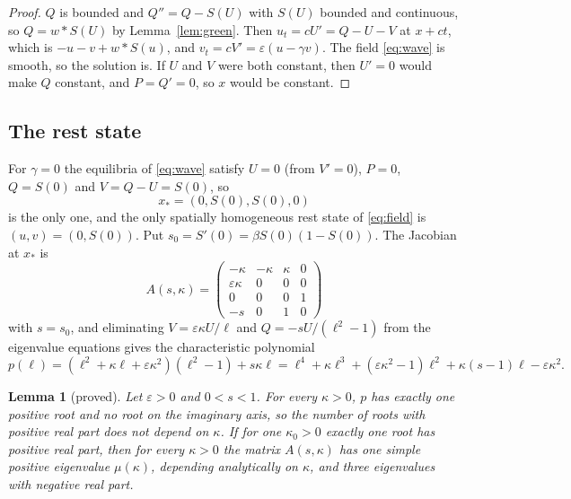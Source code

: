\documentclass[11pt]{article}
\newtheorem{lemma}{Lemma}[section]
\theoremstyle{definition}
\newcommand{\eps}{\varepsilon}
\newcommand{\xs}{x_*}
\begin{document}
\begin{proof}
$Q$ is bounded and $Q'' = Q - S(U)$ with $S(U)$ bounded and continuous, so $Q = w * S(U)$ by Lemma~\ref{lem:green}. Then $u_t = cU' = Q - U - V$ at $x + ct$, which is $-u - v + w * S(u)$, and $v_t = cV' = \eps(u - \gamma v)$. The field \eqref{eq:wave} is smooth, so the solution is. If $U$ and $V$ were both constant, then $U' = 0$ would make $Q$ constant, and $P = Q' = 0$, so $x$ would be constant.
\end{proof}

\subsection{The rest state}

For $\gamma = 0$ the equilibria of \eqref{eq:wave} satisfy $U = 0$ (from $V' = 0$), $P = 0$, $Q = S(0)$ and $V = Q - U = S(0)$, so
\begin{equation}\label{eq:rest}
  \xs = (0, S(0), S(0), 0)
\end{equation}
is the only one, and the only spatially homogeneous rest state of \eqref{eq:field} is $(u, v) = (0, S(0))$. Put $s_0 = S'(0) = \beta S(0)(1 - S(0))$. The Jacobian at $\xs$ is
\begin{equation}\label{eq:A4}
  A(s, \kappa) = \begin{pmatrix} -\kappa & -\kappa & \kappa & 0 \\ \eps\kappa & 0 & 0 & 0 \\ 0 & 0 & 0 & 1 \\ -s & 0 & 1 & 0 \end{pmatrix}
\end{equation}
with $s = s_0$, and eliminating $V = \eps\kappa U/\ell$ and $Q = -sU/(\ell^2 - 1)$ from the eigenvalue equations gives the characteristic polynomial
\begin{equation}\label{eq:charpoly}
  p(\ell) = (\ell^2 + \kappa\ell + \eps\kappa^2)(\ell^2 - 1) + s\kappa\ell = \ell^4 + \kappa\ell^3 + (\eps\kappa^2 - 1)\ell^2 + \kappa(s - 1)\ell - \eps\kappa^2 .
\end{equation}

\begin{lemma}[proved]\label{lem:rest}
Let $\eps > 0$ and $0 < s < 1$. For every $\kappa > 0$, $p$ has exactly one positive root and no root on the imaginary axis, so the number of roots with positive real part does not depend on $\kappa$. If for one $\kappa_0 > 0$ exactly one root has positive real part, then for every $\kappa > 0$ the matrix $A(s, \kappa)$ has one simple positive eigenvalue $\mu(\kappa)$, depending analytically on $\kappa$, and three eigenvalues with negative real part.
\end{lemma}
\end{document}
